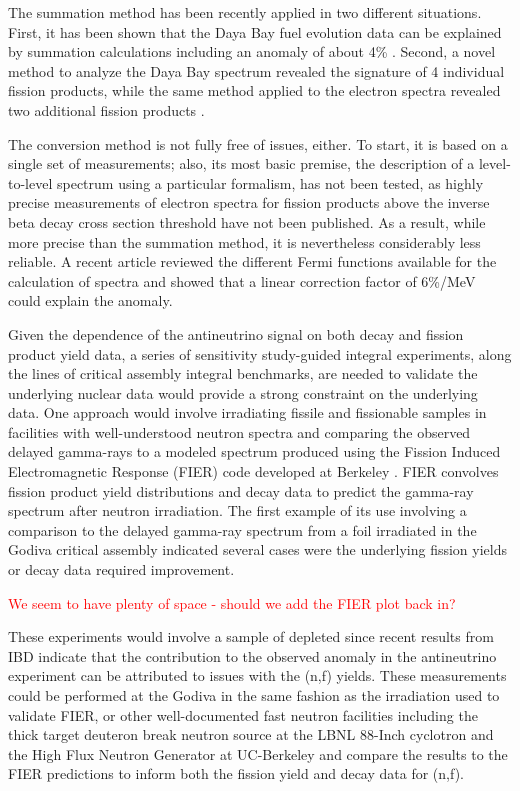 \documentclass[letterpaper]{ar-1col}
\newcommand{\textred}[1]{\textcolor{red}{ #1}}
\begin{document}
The summation method has been recently applied in two different situations.   First, it has been shown that the Daya Bay fuel evolution data \cite{An17} can be explained by summation calculations including an anomaly of about 4\% \cite{Hay18}.   Second, a novel method to analyze the Daya Bay spectrum revealed the signature of 4 individual fission products, while the same method applied to the electron spectra revealed two additional fission products \cite{Son18}.   

The conversion method is not fully free of issues, either.  To start, it is based on a single set of measurements; also, its most basic premise, the description of a level-to-level spectrum using a particular formalism, has not been tested, as highly precise measurements of electron spectra for fission products above the inverse beta decay cross section threshold have not been published.    As a result, while more precise than the summation method, it is nevertheless considerably less reliable.     A recent article \cite{Son17} reviewed the different Fermi functions available for the calculation of spectra and showed that a linear correction factor of 6\%/MeV could explain the anomaly.

Given the dependence of the antineutrino signal on both decay and fission product yield data, a series of sensitivity study-guided integral experiments, along the lines of critical assembly integral benchmarks, are needed to validate the underlying nuclear data would provide a strong constraint on the underlying data.  One approach would involve irradiating fissile and fissionable samples in facilities with well-understood neutron spectra and comparing the observed delayed gamma-rays to a modeled spectrum produced using the Fission Induced Electromagnetic Response (FIER) code developed at Berkeley \cite{Matthews2018}.  FIER convolves fission product yield distributions and decay data to predict the gamma-ray spectrum after neutron irradiation.  The first example of its use involving a comparison to the delayed gamma-ray spectrum from a  foil irradiated in the Godiva critical assembly indicated several cases were the underlying fission yields or decay data required improvement. 

\textred{We seem to have plenty of space - should we add the FIER plot back in?}

These experiments would involve a sample of depleted  since recent results from IBD indicate that the contribution to the observed anomaly in the antineutrino experiment can be attributed to issues with the (n,f) yields. These measurements could be performed at the Godiva in the same fashion as the  irradiation used to validate FIER, or other well-documented fast neutron facilities including the thick target deuteron break neutron source at the LBNL 88-Inch cyclotron \cite{Harrig2018} and the High Flux Neutron Generator at UC-Berkeley \cite{All18} and compare the results to the FIER predictions to inform both the fission yield and decay data for (n,f). 
\end{document}
